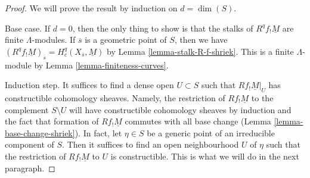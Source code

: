 \documentclass{stacks-project}
\theoremstyle{plain}
\theoremstyle{definition}
\theoremstyle{remark}
\numberwithin{equation}{subsection}
\begin{document}
\begin{proof}
We will prove the result by induction on $d = \dim(S)$.

\medskip\noindent
Base case. If $d = 0$, then the only thing to show is that the stalks
of $R^qf_!\underline{M}$ are finite $\Lambda$-modules.
If $\overline{s}$ is a geometric point of $S$, then we have
$(R^qf_!\underline{M})_{\overline{s}} = H^q_c(X_{\overline{s}}, \underline{M})$
by Lemma \ref{lemma-stalk-R-f-shriek}.
This is a finite $\Lambda$-module by Lemma \ref{lemma-finiteness-curves}.

\medskip\noindent
Induction step. It suffices to find a dense open $U \subset S$ such
that $Rf_!\underline{M}|_U$ has constructible cohomology sheaves.
Namely, the restriction of $Rf_!\underline{M}$ to the complement
$S \setminus U$ will have constructible cohomology sheaves by induction
and the fact that formation of $Rf_!\underline{M}$ commutes
with all base change (Lemma \ref{lemma-base-change-shriek}).
In fact, let $\eta \in S$ be a generic point of an irreducible
component of $S$. Then it suffices to find an open neighbourhood $U$
of $\eta$ such that the restriction of $Rf_!\underline{M}$
to $U$ is constructible. This is what we will do in the next paragraph.


\end{proof}
\end{document}
